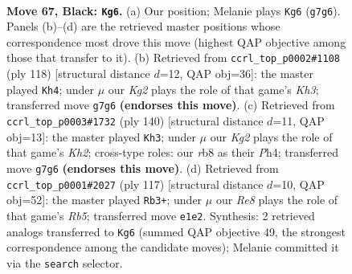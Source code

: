 \documentclass[11pt]{article}
\begin{document}
\clearpage

\begin{figure}[p]\centering
\begin{subfigure}{0.46\textwidth}\centering
\resizebox{\linewidth}{!}{%
\newchessgame
\chessboard[
  setfen={1R6/R4pk1/4p3/8/P3P3/5PK1/8/4r3 b - - 26 67},
  showmover=false,
  pgfstyle=straightmove, color=movearrow, markmove={g7-g6}
]}
\caption{}
\end{subfigure}\hfill
\begin{subfigure}{0.46\textwidth}\centering
\resizebox{\linewidth}{!}{%
\newchessgame
\chessboard[
  setfen={1R6/6k1/1p4p1/8/5P2/1r4PK/8/8 w - - 29 60},
  showmover=false,
  pgfstyle=straightmove, color=movearrow, markmove={h3-h4}
]}
\caption{}
\end{subfigure}
\\[4pt]
\begin{subfigure}{0.46\textwidth}\centering
\resizebox{\linewidth}{!}{%
\newchessgame
\chessboard[
  setfen={8/6k1/R5p1/p6p/7P/5P2/r5PK/8 w - - 14 71},
  showmover=false,
  pgfstyle=straightmove, color=movearrow, markmove={h2-h3}
]}
\caption{}
\end{subfigure}\hfill
\begin{subfigure}{0.46\textwidth}\centering
\resizebox{\linewidth}{!}{%
\newchessgame
\chessboard[
  setfen={8/R4pk1/8/P6p/1r5P/5KP1/8/8 b - - 0 59},
  showmover=false,
  pgfstyle=straightmove, color=movearrow, markmove={b4-b3}
]}
\caption{}
\end{subfigure}
\caption{\textbf{Move 67, Black: \texttt{Kg6}.} (a) Our position; Melanie plays \texttt{Kg6} (\texttt{g7g6}). Panels (b)--(d) are the retrieved master positions whose correspondence most drove this move (highest QAP objective among those that transfer to it). (b) Retrieved from \texttt{ccrl\_top\_p0002\#1108} (ply 118) [structural distance $d$=12, QAP obj=36]: the master played \texttt{Kh4}; under $\mu$ our \emph{Kg2} plays the role of that game's \emph{Kh3}; transferred move \texttt{g7g6} \textbf{(endorses this move)}. (c) Retrieved from \texttt{ccrl\_top\_p0003\#1732} (ply 140) [structural distance $d$=11, QAP obj=13]: the master played \texttt{Kh3}; under $\mu$ our \emph{Kg2} plays the role of that game's \emph{Kh2}; cross-type roles: our \emph{r}b8 as their \emph{P}h4; transferred move \texttt{g7g6} \textbf{(endorses this move)}. (d) Retrieved from \texttt{ccrl\_top\_p0001\#2027} (ply 117) [structural distance $d$=10, QAP obj=52]: the master played \texttt{Rb3+}; under $\mu$ our \emph{Re8} plays the role of that game's \emph{Rb5}; transferred move \texttt{e1e2}. Synthesis: 2 retrieved analogs transferred to \texttt{Kg6} (summed QAP objective 49, the strongest correspondence among the candidate moves); Melanie committed it via the \texttt{search} selector.}
\label{fig:thought-m133}
\end{figure}
\end{document}
